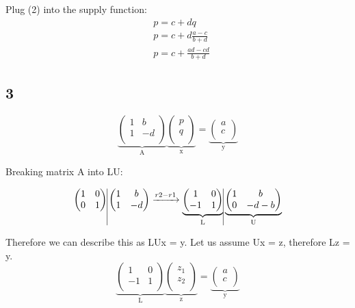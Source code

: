 \documentclass[12pt]{report}
\begin{document}
Plug (2) into the supply function:
\begin{equation}
\begin{aligned}
& p = c + dq\\
& p = c + d \frac{a - c}{b + d}\\
& p = c + \frac{ad - cd}{b + d}
\end{aligned}
\end{equation}

\subsection*{3}
$$
\underbrace{ \begin{pmatrix}
1&b\\
1&-d\\
\end{pmatrix}}_\text{A}
\underbrace{\begin{pmatrix}
p\\
q\\
\end{pmatrix}}_\text{x}
=
\underbrace{\begin{pmatrix}
a\\
c\\
\end{pmatrix}}_\text{y}
$$

Breaking matrix A into LU:

$$
\begin{pmatrix}
1&0\\
0&1\\
\end{pmatrix}
\vline
\begin{pmatrix}
1&b\\
1&-d\\
\end{pmatrix}
\xrightarrow{r2 - r1}
\underbrace{\begin{pmatrix}
1&0\\
-1&1\\
\end{pmatrix}}_\text{L}
\vline
\underbrace{\begin{pmatrix}
1&b\\
0&-d - b\\
\end{pmatrix}}_\text{U}
$$

Therefore we can describe this as LUx = y. Let us assume Ux = z, therefore Lz = y.
$$
\underbrace{\begin{pmatrix}
1&0\\
-1&1\\
\end{pmatrix}}_\text{L}
\underbrace{\begin{pmatrix}
z_1\\
z_2\\
\end{pmatrix}}_\text{z}
=
\underbrace{\begin{pmatrix}
a\\
c\\
\end{pmatrix}}_\text{y}
$$
\end{document}
